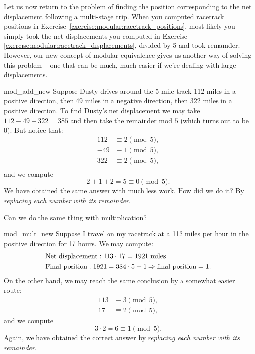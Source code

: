 Let us now return to the problem of finding the position corresponding to the net displacement following a multi-stage trip.
When you computed racetrack positions in Exercise~\ref{exercise:modular:racetrack_positions}, most 
likely you simply took the net displacements you computed in Exercise \ref{exercise:modular:racetrack_displacements}, divided by 5 and took remainder. 
However, our new concept of modular equivalence gives us another way of solving this problem -- one that can be much, much easier if we're dealing with large displacements.

\begin{example}{mod_add_new}
Suppose  Dusty drives around the 5-mile track 112 miles in a positive direction, then 49 miles in a negative direction, then 322 miles in a positive direction.  To find Dusty's net displacement we may take $112 - 49 + 322 = 385$ and then take the remainder mod $5$ (which turns out to be 0). But notice that:
\begin{align*}
112 &\equiv 2 \pmod{5},\\
-49 &\equiv 1 \pmod{5},\\
322 &\equiv 2 \pmod{5},\\
\end{align*}
and we compute
\[2 + 1 + 2 = 5 \equiv 0 \pmod{5}. \]
We have obtained the same answer with much less work. How did we do it? By \emph{replacing each number with its remainder}.
\end{example}

\noindent
Can we do the same thing with multiplication? 

\begin{example}{mod_mult_new}
Suppose I travel on my racetrack at a 113 miles per hour in the positive direction  for 17 hours. We may compute:
\begin{align}
&\text{Net displacement}: 113 \cdot 17 = 1921 \text{ miles} \notag\\
&\text{Final position}: 1921 = 384\cdot 5 + 1 \implies \text{final position} = 1. \notag
\end{align}
On the other hand, we may reach the same conclusion by a somewhat easier route:
\begin{align*}
113 &\equiv 3 \pmod{5},\\
17 &\equiv 2 \pmod{5},
\end{align*}
and we compute
\[3 \cdot 2 = 6 \equiv 1\pmod{5}. \]
Again, we have obtained the correct answer by \emph{replacing each number with its remainder}.
\end{example}

